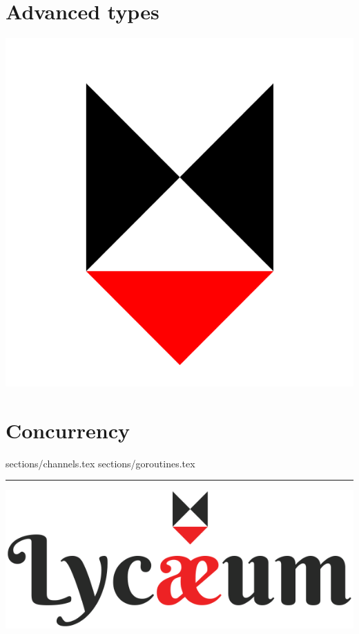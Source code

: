 \documentclass{../refsheet}
\begin{document}
\section{Advanced types}




\begin{center}
\includegraphics[scale=0.02]{../images/lycaeum-logo.png}
\end{center}

\section{Concurrency}
 {sections/channels.tex}
 {sections/goroutines.tex}


\noindent\rule{\linewidth}{0.05ex}
\begin{center}
\includegraphics[scale=0.2]{../images/Lycaeum-logo-600.png}
\end{center}
\end{document}
